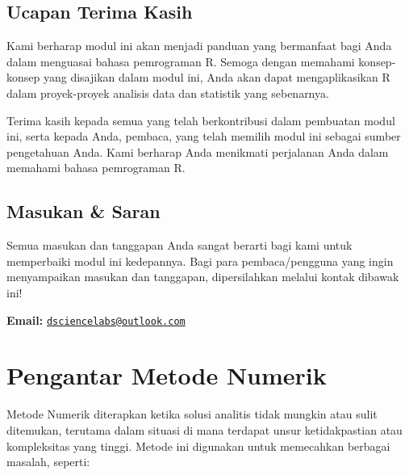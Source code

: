 \documentclass[
]{book}
\theoremstyle{definition}
\theoremstyle{definition}
\theoremstyle{definition}
\theoremstyle{definition}
\theoremstyle{remark}
\begin{document}
\hypertarget{ucapan-terima-kasih}{%
\section*{Ucapan Terima Kasih}\label{ucapan-terima-kasih}}

Kami berharap modul ini akan menjadi panduan yang bermanfaat bagi Anda dalam menguasai bahasa pemrograman R. Semoga dengan memahami konsep-konsep yang disajikan dalam modul ini, Anda akan dapat mengaplikasikan R dalam proyek-proyek analisis data dan statistik yang sebenarnya.

Terima kasih kepada semua yang telah berkontribusi dalam pembuatan modul ini, serta kepada Anda, pembaca, yang telah memilih modul ini sebagai sumber pengetahuan Anda. Kami berharap Anda menikmati perjalanan Anda dalam memahami bahasa pemrograman R.

\hypertarget{masukan-saran}{%
\section*{Masukan \& Saran}\label{masukan-saran}}

Semua masukan dan tanggapan Anda sangat berarti bagi kami untuk memperbaiki modul ini kedepannya. Bagi para pembaca/pengguna yang ingin menyampaikan masukan dan tanggapan, dipersilahkan melalui kontak dibawak ini!

\textbf{Email:} \href{mailto:dsciencelabs@outlook.com}{\nolinkurl{dsciencelabs@outlook.com}}

\hypertarget{pengantar-metode-numerik}{%
\chapter{Pengantar Metode Numerik}\label{pengantar-metode-numerik}}

Metode Numerik diterapkan ketika solusi analitis tidak mungkin atau sulit ditemukan, terutama dalam situasi di mana terdapat unsur ketidakpastian atau kompleksitas yang tinggi. Metode ini digunakan untuk memecahkan berbagai masalah, seperti:
\end{document}
